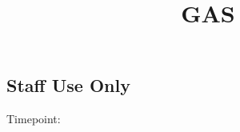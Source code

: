 \documentclass[
  14pt,
  english,
  a4paper,
  sdaps_style=code128,
  checkmode=check
]{sdapsclassic}
\title{GAS}
\author{}
\date{}
\begin{document}
\begin{questionnaire}[noinfo]


\section{Staff Use Only}

    \noindent
    \begin{minipage}[t]{0.48\linewidth}
    \end{minipage}\hfill
    \begin{minipage}[t]{0.48\linewidth}
    \end{minipage}

    \noindent
    \begin{minipage}[c]{3cm}
        Timepoint:
    \end{minipage}%
    \begin{minipage}[c]{\dimexpr\linewidth-1cm\relax}
        \begin{optionquestion}[cols=4, var=timepoint]{}
        \end{optionquestion}
    \end{minipage}


\end{questionnaire}
\end{document}
